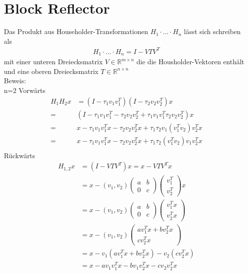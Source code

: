 \chapter{Block Reflector}
Das Produkt aus Householder-Transformationen $H_1 \cdot ... \cdot H_n$ lässt sich schreiben als 
\begin{align*}
	H_1 \cdot ... \cdot H_n = I - VTV^T
\end{align*}
mit einer unteren Dreiecksmatrix $V \in \mathbb{R}^{m \times n}$ die die Housholder-Vektoren enthält und eine oberen Dreiecksmatrix $T \in \mathbb{R}^{n \times n}$ \cite{Joffrain:2006:AHT:1141885.1141886}\\
Beweis:\\
n=2
Vorwärts 
\begin{align*}
	H_1 H_2 x &= (I-\tau_1 v_1 v_1^T)(I-\tau_2 v_2 v_2^T)x\\
	= &(I - \tau_1 v_1 v_1^T - \tau_2 v_2 v_2^T +  \tau_1 v_1 v_1^T \tau_2 v_2 v_2^T )x\\
  = &x - \tau_1 v_1 v_1^T x - \tau_2 v_2 v_2^T x + \tau_1 \tau_2 v_1 (v_1^T v_2 )v_2^T x\\
  = &x - \tau_1 v_1 v_1^T x - \tau_2 v_2 v_2^T x + \tau_1 \tau_2 (v_1^T v_2 ) v_1 v_2^T x\\
\end{align*}
Rückwärts
\begin{align*}
H_{1,2} x &= (I - V T V^T) x = x - V T V^T x\\
&= x - (v_1, v_2)
\begin{pmatrix}
a & b \\ 0 & c
\end{pmatrix}
\begin{pmatrix}
v_1^T \\ v_2^T 
\end{pmatrix}
x\\
&= x - (v_1, v_2)
\begin{pmatrix}
a & b \\ 0 & c
\end{pmatrix}
\begin{pmatrix}
v_1^T x \\ v_2^T x
\end{pmatrix}\\
&= x - (v_1, v_2)
\begin{pmatrix}
a v_1^T x + b v_2^T x\\  c v_2^T x
\end{pmatrix}\\
&= x - v_1(a v_1^T x + b v_2^T x) - v_2 (c v_2^T x)\\
&= x - a v_1 v_1^T x - b v_1 v_2^T x - c v_2 v_2^T x
\end{align*}
